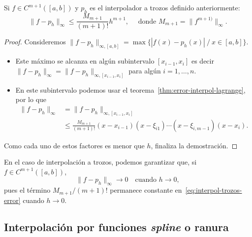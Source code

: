 \begin{theorem}
  \label{thm:interpol-trozos-error}
  Si $f\in C^{m+1}( [a,b])$ y $p_h$ es el interpolador a trozos
  definido anteriormente:
  \begin{equation}
    \|f-p_h\|_\infty\le\frac{M_{m+1}}{(m+1)!}h^{m+1},
    \quad
    \text{ donde } M_{m+1}=\|f^{m+1)}\|_\infty.
    \label{eq:interpol-trozos-error}
  \end{equation}
\end{theorem}

\begin{proof}
  Consideremos $\|f-p_h\|_{\infty, [a,b]}=\max\{ |f(x)-p_h(x)|\ /\
  x\in[a,b]\}$.
  \begin{itemize}
  \item Este máximo se alcanza en algún subintervalo $[x_{i-1},x_{i}]$
    es decir $\|f-p_h\|_{\infty}=\|f-p_h\|_{\infty, [x_{i-1},x_i]}$
    para algún $i=1,\dots,n$.
  \item En este subintervalo podemos usar el
    teorema~\ref{thm:error-interpol-lagrange}, por lo que
    \begin{align*}
      \|f-p_h\|_\infty &= \|f-p_h\|_{\infty, [x_{i-1},x_i]}  \\
                       &\le\frac{M_{m+1}}{(m+1)!}
                         (x-x_{i-1})(x-\xi_{i1})\cdots(x-\xi_{i,m-1})(x-x_i).
    \end{align*}
  \end{itemize}
  Como cada uno de estos factores es menor que $h$, finaliza la
  demostración.
\end{proof}

\begin{remark}
  \label{rk:3}
  En el caso de interpolación a trozos, podemos garantizar que, si
  $f\in C^{m+1}([a,b])$,
  \begin{equation*}
    \|f-p_h\|_\infty \to 0 \quad \text{cuando } h \to 0,
  \end{equation*}
  pues el término $M_{m+1}/(m+1)!$ permanece constante
  en~\ref{eq:interpol-trozos-error} cuando $h\to 0$.
\end{remark}

\subsection{Interpolación por funciones \textit{spline} o ranura}
\label{sec:splines}

